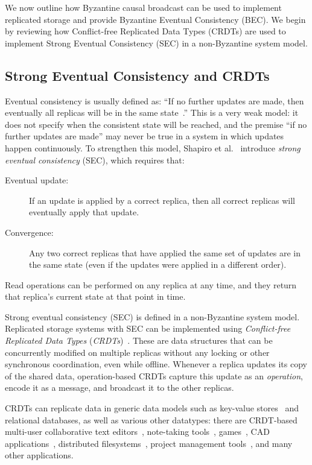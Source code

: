\documentclass[a4paper,anonymous,USenglish]{lipics-v2019}
\begin{document}
We now outline how Byzantine causal broadcast can be used to implement replicated storage and provide Byzantine Eventual Consistency (BEC).
We begin by reviewing how Conflict-free Replicated Data Types (CRDTs) are used to implement Strong Eventual Consistency (SEC) in a non-Byzantine system model.

\subsection{Strong Eventual Consistency and CRDTs}

Eventual consistency is usually defined as: ``If no further updates are made, then eventually all replicas will be in the same state~\cite{Vogels:2009ca}.''
This is a very weak model: it does not specify when the consistent state will be reached, and the premise ``if no further updates are made'' may never be true in a system in which updates happen continuously.
To strengthen this model, Shapiro et al.~\cite{Shapiro:2011} introduce \emph{strong eventual consistency} (SEC), which requires that:

\begin{description}
\item[Eventual update:] If an update is applied by a correct replica, then all correct replicas will eventually apply that update.
\item[Convergence:] Any two correct replicas that have applied the same set of updates are in the same state (even if the updates were applied in a different order).
\end{description}

Read operations can be performed on any replica at any time, and they return that replica's current state at that point in time.

Strong eventual consistency (SEC) is defined in a non-Byzantine system model.
Replicated storage systems with SEC can be implemented using \emph{Conflict-free Replicated Data Types} (\emph{CRDTs})~\cite{Shapiro:2011}.
These are data structures that can be concurrently modified on multiple replicas without any locking or other synchronous coordination, even while offline.
Whenever a replica updates its copy of the shared data, operation-based CRDTs capture this update as an \emph{operation}, encode it as a message, and broadcast it to the other replicas.

CRDTs can replicate data in generic data models such as key-value stores~\cite{Akkoorath2016Cure,Zawirski2015SwiftCloud} and relational databases, as well as various other datatypes: there are CRDT-based multi-user collaborative text editors~\cite{Weiss:2009ht}, note-taking tools~\cite{vanHardenberg2020PushPin}, games~\cite{vanderLinde:2017fu}, CAD applications~\cite{Lv:2018ie}, distributed filesystems~\cite{Najafzadeh:2018bw,Tao:2015gd}, project management tools~\cite{Kleppmann2019localfirst}, and many other applications.
\end{document}
